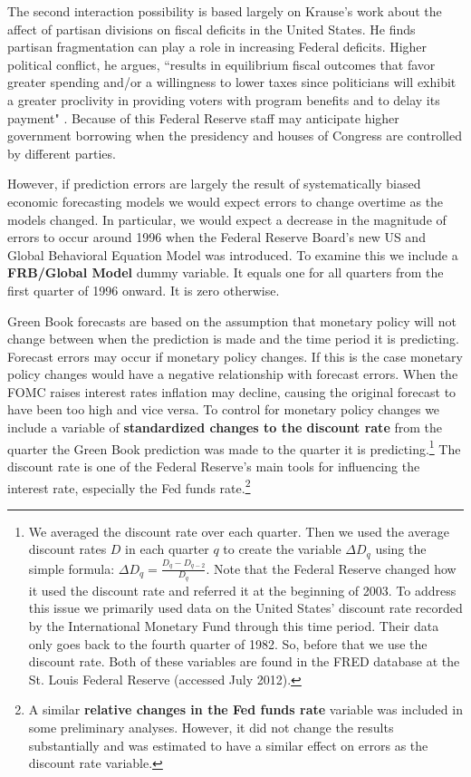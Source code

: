 \documentclass[a4paper]{article}\usepackage{graphicx, color}
\begin{document}
The second interaction possibility is based largely on Krause's \citeyearpar{Krause2000} work about the affect of partisan divisions on fiscal deficits in the United States. He finds partisan fragmentation can play a role in increasing Federal deficits. Higher political conflict, he argues, ``results in equilibrium fiscal outcomes that favor greater spending and/or a willingness to lower taxes since politicians will exhibit a greater proclivity in providing voters with program benefits and to delay its payment" \citep[][542]{Krause2000}. Because of this Federal Reserve staff may anticipate higher government borrowing when the presidency and houses of Congress are controlled by different parties. 

However, if prediction errors are largely the result of systematically biased economic forecasting models we would expect errors to change overtime as the models changed. In particular, we would expect a decrease in the magnitude of errors to occur around 1996 when the Federal Reserve Board's new US and Global Behavioral Equation Model was introduced. To examine this we include a {\bf{FRB/Global Model}} dummy variable. It equals one for all quarters from the first quarter of 1996 onward. It is zero otherwise.

Green Book forecasts are based on the assumption that monetary policy will not change between when the prediction is made and the time period it is predicting. Forecast errors may occur if monetary policy changes. If this is the case monetary policy changes would have a negative relationship with forecast errors. When the FOMC raises interest rates inflation may decline, causing the original forecast to have been too high and vice versa. To control for monetary policy changes we include a variable of {\bf{standardized changes to the discount rate}} from the quarter the Green Book prediction was made to the quarter it is predicting.\footnote{We averaged the discount rate over each quarter. Then we used the average discount rates $D$ in each quarter $q$ to create the variable $\Delta D_{q}$ using the simple formula: $\Delta D_{q} = \frac{D_{q} - D_{q-2}}{D_{q}}$. Note that the Federal Reserve changed how it used the discount rate and referred it at the beginning of 2003. To address this issue we primarily used data on the United States' discount rate recorded by the International Monetary Fund through this time period. Their data only goes back to the fourth quarter of 1982. So, before that we use the discount rate. Both of these variables are found in the FRED database at the St. Louis Federal Reserve (accessed July 2012). } The discount rate is one of the Federal Reserve's main tools for influencing the interest rate, especially the Fed funds rate.\footnote{A similar {\bf{relative changes in the Fed funds rate}} variable was included in some preliminary analyses. However, it did not change the results substantially and was estimated to have a similar effect on errors as the discount rate variable.}
\end{document}
